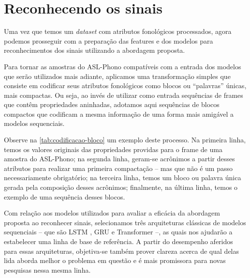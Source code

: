 \section{Reconhecendo os sinais}
\label{sec:metodologia-reconhecimento}

Uma vez que temos um \textit{dataset} com atributos fonológicos processados, agora podemos prosseguir com a preparação das features e dos modelos para reconhecimentos dos sinais utilizando a abordagem proposta.

Para tornar as amostras do ASL-Phono compatíveis com a entrada dos modelos que serão utilizados mais adiante, aplicamos uma transformação simples que consiste em codificar seus atributos fonológicos como blocos ou ``palavras'' únicas, mais compactas. Ou seja, ao invés de utilizar como entrada sequências de frames que contêm propriedades aninhadas, adotamos aqui sequências de blocos compactos que codificam a mesma informação de uma forma mais amigável a modelos sequenciais.

Observe na \autoref{tab:codificacao-bloco} um exemplo deste processo. Na primeira linha, temos os valores originais das propriedades providas para o frame de uma amostra do ASL-Phono; na segunda linha, geram-se acrônimos a partir desses atributos para realizar uma primeira compactação -- mas que não é um passo necessariamente obrigatório; na terceira linha, temos um bloco ou palavra única gerada pela composição desses acrônimos; finalmente, na última linha, temos o exemplo de uma sequência desses blocos.






Com relação aos modelos utilizados para avaliar a eficácia da abordagem proposta ao reconhecer sinais, selecionamos três arquiteturas clássicas de modelos sequenciais -- que são LSTM \cite{hochreiter-1997-lstm}, GRU \cite{cho-2014-gru} e Transformer \cite{vaswani-2017-transformer} --, as quais nos ajudarão a estabelecer uma linha de base de referência. A partir do desempenho aferidos para essas arquiteturas, objetiva-se também prover clareza acerca de qual delas lida aborda melhor o problema em questão e é mais promissora para novas pesquisas nessa mesma linha.
 








